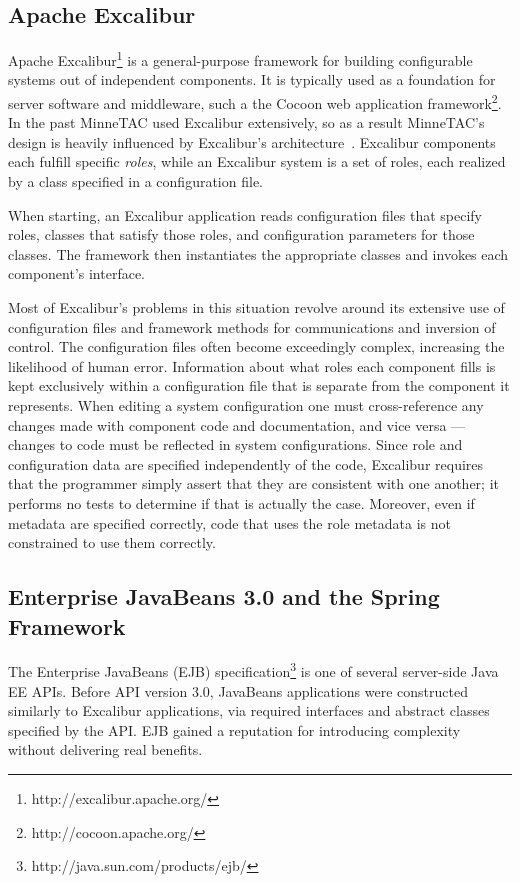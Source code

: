 \documentclass{article}
\begin{document}
\subsection{Apache Excalibur}

Apache Excalibur\footnote{http://excalibur.apache.org/} is a general-purpose framework for building configurable systems out of independent components.
It is typically used as a foundation for server software and middleware, such a the Cocoon web application framework\footnote{http://cocoon.apache.org/}.
In the past MinneTAC used Excalibur extensively, so as a result MinneTAC's design is heavily influenced by Excalibur's architecture~\cite{Collins08ECRA}.
Excalibur components each fulfill specific \emph{roles}, while an Excalibur system is a set of roles, each realized by a class specified in a configuration file.

When starting, an Excalibur application reads configuration files that specify roles, classes that satisfy those roles, and configuration parameters for those classes.
The framework then instantiates the appropriate classes and invokes each component's interface.

Most of Excalibur's problems in this situation revolve around its extensive use of configuration files and framework methods for communications and inversion of control.
The configuration files often become exceedingly complex, increasing the likelihood of human error.
Information about what roles each component fills is kept exclusively within a configuration file that is separate from the component it represents.
When editing a system configuration one must cross-reference any changes made with component code and documentation, and vice versa --- changes to code must be reflected in system configurations.
Since role and configuration data are specified independently of the code, Excalibur requires that the programmer simply assert that they are consistent with one another; it performs no tests to determine if that is actually the case.
Moreover, even if metadata are specified correctly, code that uses the role metadata is not constrained to use them correctly.

\subsection{Enterprise JavaBeans 3.0 and the Spring Framework}

The Enterprise JavaBeans (EJB) specification\footnote{http://java.sun.com/products/ejb/} is one of several server-side Java EE APIs.
Before API version 3.0, JavaBeans applications were constructed similarly to Excalibur applications, via required interfaces and abstract classes specified by the API.
EJB gained a reputation for introducing complexity without delivering real benefits.
\end{document}
